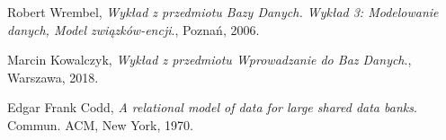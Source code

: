 \documentclass{mwrep}[15pt]
\begin{document}
\begin{thebibliography}{9}
	  Robert Wrembel,
	  \emph{Wykład z przedmiotu Bazy Danych. Wykład 3: Modelowanie danych, Model związków-encji}.,
	  Poznań,
	  2006.

	
	  Marcin Kowalczyk,
	  \emph{Wykład z przedmiotu Wprowadzanie do Baz Danych}.,
	  Warszawa,
	  2018.

	  Edgar Frank Codd,
	  \emph{A relational model of data for large shared data banks}.
	  Commun. ACM,
	  New York,
	  1970.
	
	\end{thebibliography}
\end{document}
